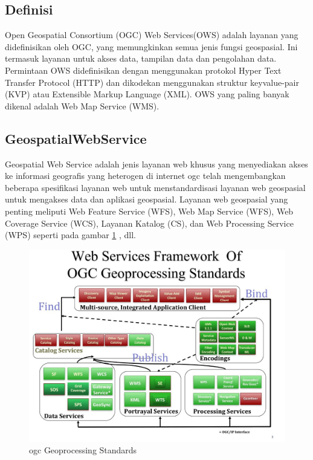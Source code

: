 \begin{enumerize}
\subsection{Definisi}
Open Geospatial Consortium (OGC) Web Services(OWS) adalah layanan yang didefinisikan oleh OGC, 
yang memungkinkan semua jenis fungsi geospasial. 
Ini termasuk layanan untuk akses data, tampilan data dan pengolahan data. 
Permintaan OWS didefinisikan dengan menggunakan protokol Hyper Text Transfer Protocol (HTTP) 
dan dikodekan menggunakan struktur keyvalue-pair (KVP) atau Extensible Markup Language (XML). 
OWS yang paling banyak dikenal adalah Web Map Service (WMS). \cite{lupp2008open} 

\subsection{GeospatialWebService}
Geospatial Web Service adalah jenis layanan web khusus yang menyediakan akses ke informasi geografis yang heterogen di internet ogc telah mengembangkan beberapa
spesifikasi layanan web untuk menstandardisasi layanan web geospasial untuk mengakses data dan aplikasi geospasial. 
Layanan web geospasial yang penting meliputi Web Feature Service (WFS), Web Map Service (WFS), Web Coverage Service (WCS), 
Layanan Katalog (CS), dan Web Processing Service (WPS) seperti pada gambar \ref{framework} , dll. \cite{lupp2008open} 

\begin{figure}[ht]
	\centerline{\includegraphics[width=1\textwidth]{figures/framework.JPG}}
	\caption{ogc Geoprocessing Standards}
	\label{framework}
	\end{figure}
	

\end{enumerize}
